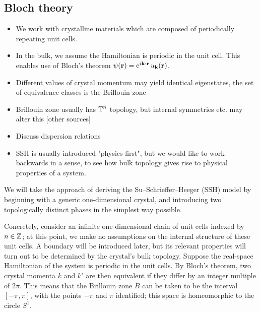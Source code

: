 \subsection{Bloch theory}
{\color{blue}
\begin{itemize}
	\item We work with crystalline materials which are composed of periodically repeating unit cells.
	
	\item In the bulk, we assume the Hamiltonian is periodic in the unit cell. This enables use of Bloch's theorem \cite{Bloch_theorem} $\psi(\vb{r}) = \operatorname{e}^{i\vb{k}\cdot\vb{r}}u_{\vb{k}}(\vb{r})$.
	
	\item Different values of crystal momentum may yield identical eigenstates, the set of equivalence classes is the Brillouin zone
	
	\item Brillouin zone usually has $\mathbb{T}^n$ topology, but internal symmetries etc. may alter this \cite{Fonseca-Vaidya_nonorientable} [other sources]
	
	\item Discuss dispersion relations
\end{itemize}
}


\label{sec:SSH}
{\color{blue}
	\begin{itemize}
		\item SSH is usually introduced "physics first", but we would like to work backwards in a sense, to see how bulk topology gives rise to physical properties of a system.
	\end{itemize}
}

We will take the approach of deriving the Su--Schrieffer--Heeger (SSH) model by beginning with a generic one-dimensional crystal, and introducing two topologically distinct phases in the simplest way possible.

Concretely, consider an infinite one-dimensional chain of unit cells indexed by $n\in\mathbb{Z}$; at this point, we make no assumptions on the internal structure of these unit cells. A boundary will be introduced later, but its relevant properties will turn out to be determined by the crystal's bulk topology. Suppose the real-space Hamiltonian of the system is periodic in the unit cells. By Bloch's theorem, two crystal momenta $k$ and $k'$ are then equivalent if they differ by an integer multiple of $2\pi$. This means that the Brillouin zone $B$ can be taken to be the interval $[-\pi,\pi]$, with the points $-\pi$ and $\pi$ identified; this space is homeomorphic to the circle $S^1$.

